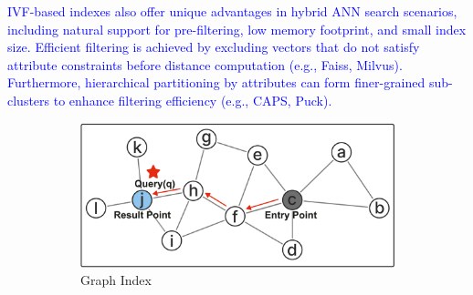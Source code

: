 \documentclass[sigconf, nonacm]{acmart}
\begin{document}
{	\textcolor{blue}{IVF-based indexes also offer unique advantages in hybrid ANN search scenarios, including natural support for pre-filtering, low memory footprint, and small index size. Efficient filtering is achieved by excluding vectors that do not satisfy attribute constraints before distance computation (e.g., Faiss, Milvus). Furthermore, hierarchical partitioning by attributes can form finer-grained sub-clusters to enhance filtering efficiency (e.g., CAPS, Puck).}
%	
%	
	
	\begin{figure}
		\begin{subfigure}{0.60\columnwidth}
			\centering
			
			\includegraphics[width=\linewidth]{figures/graph.pdf}
			\caption{Graph Index}
			\label{fig:graph}
		\end{subfigure}
		\hfill
		\begin{subfigure}{0.38\columnwidth}
			\centering
			

\end{subfigure}
\end{figure}}
\end{document}
